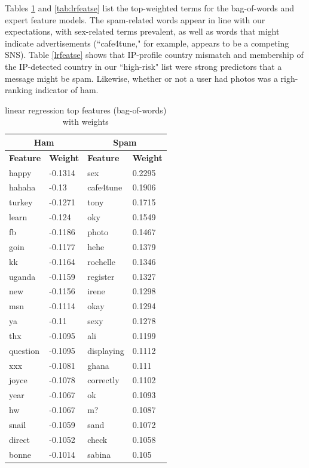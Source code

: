 \documentclass[preprint]{acm_proc_article-sp}
\begin{document}
Tables \ref{tab:lrfeats} and \ref{tab:lrfeatse} list the top-weighted terms for the bag-of-words and expert feature 
models. The spam-related words appear in line with our expectations, with sex-related terms prevalent, as well as
words that might indicate advertisements (``cafe4tune," for example, appears to be a competing SNS). Table \ref{lrfeatse} 
shows that IP-profile country mismatch and membership of the IP-detected country in our ``high-risk" list were 
strong predictors that a message might be spam. Likewise, whether or not a user had photos was a righ-ranking indicator 
of ham.

\begin{table}
\begin{tabular}{l|l||l|l}
\multicolumn{2}{c}{\textbf{Ham}} & 
\multicolumn{2}{c}{\textbf{Spam}} \\
\hline
\textbf{Feature} & \textbf{Weight} & \textbf{Feature} & \textbf{Weight} \\
\hline
happy & -0.1314 & sex & 0.2295\\
hahaha & -0.13 & cafe4tune & 0.1906\\
turkey & -0.1271 & tony & 0.1715\\
learn & -0.124 & oky & 0.1549\\
fb & -0.1186 & photo & 0.1467\\
goin & -0.1177 & hehe & 0.1379\\
kk & -0.1164 & rochelle & 0.1346\\
uganda & -0.1159 & register & 0.1327\\
new & -0.1156 & irene & 0.1298\\
msn & -0.1114 & okay & 0.1294\\
ya & -0.11 & sexy & 0.1278\\
thx & -0.1095 & ali & 0.1199\\
question & -0.1095 & displaying & 0.1112\\
xxx & -0.1081 & ghana & 0.111\\
joyce & -0.1078 & correctly & 0.1102\\
year & -0.1067 & ok & 0.1093\\
hw & -0.1067 & m? & 0.1087\\
snail & -0.1059 & sand & 0.1072\\
direct & -0.1052 & check & 0.1058\\
bonne & -0.1014 & sabina & 0.105\\
\end{tabular}
\caption{linear regression top features (bag-of-words) with weights}
\label{tab:lrfeats}
\end{table}
\end{document}
